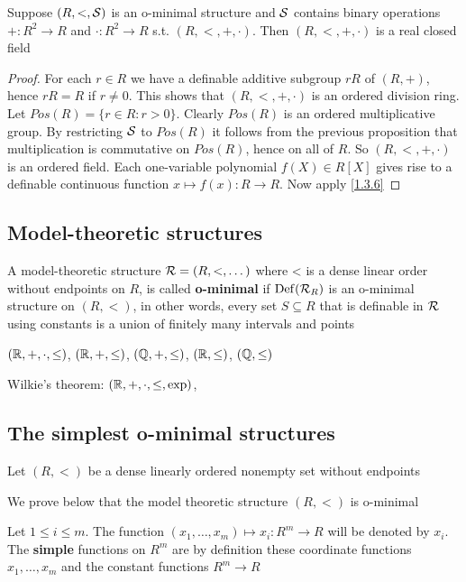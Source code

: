 \documentclass[11pt]{article}
\begin{document}
\begin{proposition}[]
Suppose \((R,<,\mathcal{S})\) is an o-minimal structure and \(\mathcal{S}\) contains binary operations \(+:R^2\to R\)
and \(\cdot:R^2\to R\) s.t. \((R,<,​+,\cdot)\). Then \((R,<, ​+,\cdot)\) is a real closed field
\end{proposition}

\begin{proof}
For each \(r\in R\) we have a definable additive subgroup \(rR\) of \((R,+)\), hence \(rR=R\)
if \(r\neq 0\). This shows that \((R,<,+,\cdot)\) is an ordered division ring.
Let \(Pos(R)=\{r\in R:r>0\}\). Clearly \(Pos(R)\) is an ordered multiplicative group. By
restricting \(\mathcal{S}\) to \(Pos(R)\) it follows from the previous proposition that multiplication is
commutative on \(Pos(R)\), hence on all of \(R\). So \((R,<,+,\cdot)\) is an ordered field. Each
one-variable polynomial \(f(X)\in R[X]\) gives rise to a definable continuous
function \(x\mapsto f(x):R\to R\). Now apply \ref{1.3.6}
\end{proof}
\subsection{Model-theoretic structures}
\label{sec:org4d25b6c}
\begin{definition}[]
A model-theoretic structure \(\mathcal{R}=(R,<,\dots)\) where < is a dense linear order without endpoints
on \(R\), is called \textbf{o-minimal} if \(\operatorname{Def}(\mathcal{R}_R)\) is an o-minimal structure on \((R,<)\), in other
words, every set \(S\subseteq R\) that is definable in \(\mathcal{R}\) using constants is a union of finitely many
intervals and points
\end{definition}

\((\mathbb{R},+,\cdot,\le)\), \((\mathbb{R},+,\le)\), \((\mathbb{Q},+,\le)\), \((\mathbb{R},\le)\), \((\mathbb{Q},\le)\)

Wilkie's theorem: \((\mathbb{R},+,\cdot,\le,\exp)\),
\subsection{The simplest o-minimal structures}
\label{sec:org4c1b96a}
Let \((R,<)\) be a dense linearly ordered nonempty set without endpoints

We prove below that the model theoretic structure \((R,<)\) is o-minimal

Let \(1\le i\le m\). The function \((x_1,\dots,x_m)\mapsto x_i:R^m\to R\) will be denoted by \(x_i\). The \textbf{simple}
functions on \(R^m\) are by definition these coordinate functions \(x_1,\dots,x_m\) and the constant
functions \(R^m\to R\)
\end{document}
